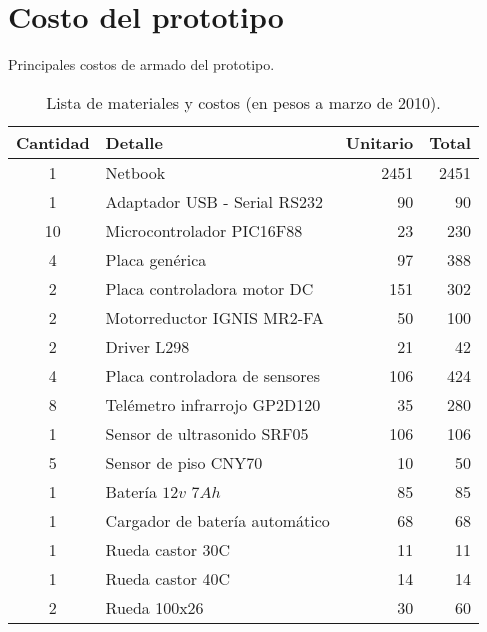 \section{Costo del prototipo}
\label{hA_costo}

Principales costos de armado del prototipo.

\begin{table}[h]
	\begin{center}
		\begin{tabular}{|c|l|r|r|}
			\hline
			Cantidad & Detalle & Unitario  & Total \\
			\hline
			1 & Netbook & 2451 & 2451 \\
			\hline
			1 & Adaptador USB - Serial RS232 & 90 & 90 \\
			\hline
			10 & Microcontrolador PIC16F88 & 23 & 230 \\
			\hline
			4 & Placa gen\'erica & 97 & 388 \\
			\hline
			2 & Placa controladora motor DC & 151 & 302 \\
			\hline
			2 & Motorreductor IGNIS MR2-FA & 50 & 100 \\
			\hline
			2 & Driver L298 & 21 & 42 \\
			\hline
			4 & Placa controladora de sensores & 106 & 424 \\
			\hline
			8 & Tel\'emetro infrarrojo GP2D120 & 35 & 280 \\
			\hline
			1 & Sensor de ultrasonido SRF05 & 106 & 106 \\
			\hline
			5 & Sensor de piso CNY70 & 10 & 50 \\
			\hline
			1 & Bater\'ia $12v$ $7Ah$  & 85 & 85 \\
			\hline
			1 & Cargador de bater\'ia autom\'atico & 68 & 68 \\
			\hline
			1 & Rueda castor 30C & 11 & 11 \\
			\hline
			1 & Rueda castor 40C & 14 & 14 \\
			\hline
			2 & Rueda 100x26 & 30 & 60 \\
			\hline
		\end{tabular}
	\end{center}
	\caption{Lista de materiales y costos (en pesos a marzo de 2010).}
	\label{hT_motorDC}
\end{table}